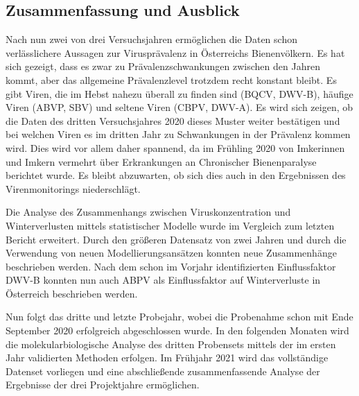 \subsection{Zusammenfassung und Ausblick}

Nach nun zwei von drei Versuchsjahren ermöglichen die Daten schon verlässlichere Aussagen zur Virusprävalenz in Österreichs Bienenvölkern. Es hat sich gezeigt, dass es zwar zu Prävalenzschwankungen zwischen den Jahren kommt, aber das allgemeine Prävalenzlevel trotzdem recht konstant bleibt. Es gibt Viren, die im Hebst nahezu überall zu finden sind (BQCV, DWV-B), häufige Viren (ABVP, SBV) und seltene Viren (CBPV, DWV-A). Es wird sich zeigen, ob die Daten des dritten Versuchsjahres 2020 dieses Muster weiter bestätigen und bei welchen Viren es im dritten Jahr zu Schwankungen in der Prävalenz kommen wird. Dies wird vor allem daher spannend, da im Frühling 2020 von Imkerinnen und Imkern vermehrt über Erkrankungen an Chronischer Bienenparalyse berichtet wurde. Es bleibt abzuwarten, ob sich dies auch in den Ergebnissen des Virenmonitorings niederschlägt.

Die Analyse des Zusammenhangs zwischen Viruskonzentration und Winterverlusten mittels statistischer Modelle wurde im Vergleich zum letzten Bericht erweitert. Durch den größeren Datensatz von zwei Jahren und durch die Verwendung von neuen Modellierungsansätzen konnten neue Zusammenhänge beschrieben werden. Nach dem schon im Vorjahr identifizierten Einflussfaktor DWV-B konnten nun auch ABPV als Einflussfaktor auf Winterverluste in Österreich beschrieben werden.

Nun folgt das dritte und letzte Probejahr, wobei die Probenahme schon mit Ende September 2020 erfolgreich abgeschlossen wurde. In den folgenden Monaten wird die molekularbiologische Analyse des dritten Probensets mittels der im ersten Jahr validierten Methoden erfolgen. Im Frühjahr 2021 wird das vollständige Datenset vorliegen und eine abschließende zusammenfassende Analyse der Ergebnisse der drei Projektjahre ermöglichen.


